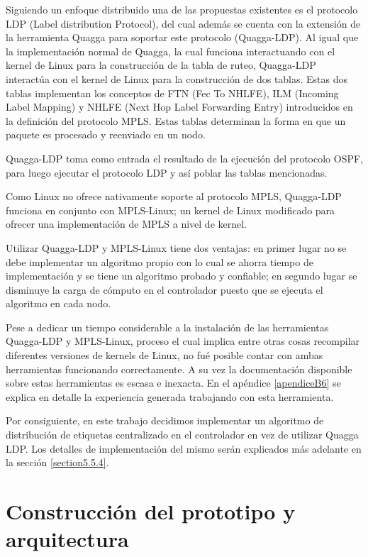 Siguiendo un enfoque distribuido una de las propuestas existentes es el protocolo LDP (Label distribution Protocol), del cual adem\'as se cuenta con la extensi\'on de la herramienta Quagga para soportar este protocolo (Quagga-LDP). Al igual que la implementaci\'on normal de Quagga, la cual funciona interactuando con el kernel de Linux para la construcci\'on de la tabla de ruteo, Quagga-LDP interact\'ua con el kernel de Linux para la construcci\'on de dos tablas. Estas dos tablas implementan los conceptos de FTN (Fec To NHLFE), ILM (Incoming Label Mapping) y NHLFE (Next Hop Label Forwarding Entry) introducidos en la definición del protocolo MPLS.  Estas tablas determinan la forma en que un paquete es procesado y reenviado en un nodo.

Quagga-LDP toma como entrada el resultado de la ejecuci\'on del protocolo OSPF, para luego ejecutar el protocolo LDP y así poblar las tablas mencionadas.

Como Linux no ofrece nativamente soporte al protocolo MPLS, Quagga-LDP funciona en conjunto con MPLS-Linux; un kernel de Linux modificado para ofrecer una implementaci\'on de MPLS a nivel de kernel.

Utilizar Quagga-LDP y MPLS-Linux tiene dos ventajas: en primer lugar no se debe implementar un algoritmo propio con lo cual se ahorra tiempo de implementaci\'on y se tiene un algoritmo probado y confiable; en segundo lugar se disminuye la carga de c\'omputo en el controlador puesto que se ejecuta el algoritmo en cada nodo.

Pese a dedicar un tiempo considerable a la instalaci\'on de las herramientas Quagga-LDP y MPLS-Linux, proceso el cual implica entre otras cosas recompilar diferentes versiones de kernels de Linux, no fu\'e posible contar con ambas herramientas funcionando correctamente. A su vez la documentaci\'on disponible sobre estas herramientas es escasa e inexacta. En el apéndice \ref{apendiceB6} se explica en detalle la experiencia generada trabajando con esta herramienta.

Por consiguiente, en este trabajo decidimos implementar un algoritmo de distribución de etiquetas centralizado en el controlador en vez de utilizar Quagga LDP. Los detalles de implementaci\'on del mismo ser\'an explicados m\'as adelante en la sección \ref{section5.5.4}.

\section{Construcci\'on del prototipo y arquitectura}


